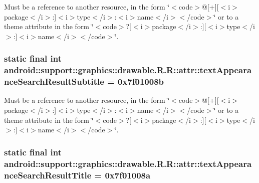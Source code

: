 Must be a reference to another resource, in the form \char`\"{}$<$code$>$@\mbox{[}+\mbox{]}\mbox{[}$<$i$>$package$<$/i$>$:\mbox{]}$<$i$>$type$<$/i$>$:$<$i$>$name$<$/i$>$$<$/code$>$\char`\"{} or to a theme attribute in the form \char`\"{}$<$code$>$?\mbox{[}$<$i$>$package$<$/i$>$:\mbox{]}\mbox{[}$<$i$>$type$<$/i$>$:\mbox{]}$<$i$>$name$<$/i$>$$<$/code$>$\char`\"{}. \hypertarget{classandroid_1_1support_1_1graphics_1_1drawable_1_1_r_1_1attr_adda799cf997a14d25b063a98efe7db8}{
\subsubsection[{textAppearanceSearchResultSubtitle}]{\setlength{\rightskip}{0pt plus 5cm}static final int android::support::graphics::drawable.R.R::attr::textAppearanceSearchResultSubtitle = 0x7f01008b}}
\label{classandroid_1_1support_1_1graphics_1_1drawable_1_1_r_1_1attr_adda799cf997a14d25b063a98efe7db8}


Must be a reference to another resource, in the form \char`\"{}$<$code$>$@\mbox{[}+\mbox{]}\mbox{[}$<$i$>$package$<$/i$>$:\mbox{]}$<$i$>$type$<$/i$>$:$<$i$>$name$<$/i$>$$<$/code$>$\char`\"{} or to a theme attribute in the form \char`\"{}$<$code$>$?\mbox{[}$<$i$>$package$<$/i$>$:\mbox{]}\mbox{[}$<$i$>$type$<$/i$>$:\mbox{]}$<$i$>$name$<$/i$>$$<$/code$>$\char`\"{}. \hypertarget{classandroid_1_1support_1_1graphics_1_1drawable_1_1_r_1_1attr_82a7b9b04f981edd905ead074b45af60}{
\subsubsection[{textAppearanceSearchResultTitle}]{\setlength{\rightskip}{0pt plus 5cm}static final int android::support::graphics::drawable.R.R::attr::textAppearanceSearchResultTitle = 0x7f01008a}}
\label{classandroid_1_1support_1_1graphics_1_1drawable_1_1_r_1_1attr_82a7b9b04f981edd905ead074b45af60}


